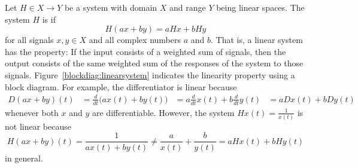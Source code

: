Let $H \in X \to Y$ be a system with domain $X$ and range $Y$ being linear spaces.  The system $H$ is  if
\[
H( ax + by) = a Hx + b Hy
\]
for all signals $x, y \in X$ and all complex numbers $a$ and $b$.  That is, a linear system has the property: If the input consists of a weighted sum of signals, then the output consists of the same weighted sum of the responses of the system to those signals.  Figure~\ref{blockdiag:linearsystem} indicates the linearity property using a block diagram.  For example, the differentiator is linear because
\begin{align*}
D(ax + by)(t) &= \frac{d}{dt}\big(ax(t) + by(t)\big) 
&= a\frac{d}{dt}x(t) + b\frac{d}{dt}y(t) 
&= aDx(t) + bDy(t)
\end{align*}
whenever both $x$ and $y$ are differentiable.  
However, the system $Hx(t) = \frac{1}{x(t)}$ is not linear because
\[
H(ax + by)(t) = \frac{1}{ax(t) + by(t)} \neq \frac{a}{x(t)} + \frac{b}{y(t)} = aHx(t) + bHy(t)
\]
in general.


